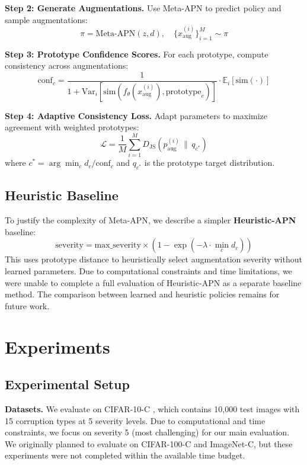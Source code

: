 \documentclass{article}
\begin{document}
\textbf{Step 2: Generate Augmentations.} Use Meta-APN to predict policy and sample augmentations:
\begin{equation}
    \pi = \text{Meta-APN}(z, d), \quad \{x_\text{aug}^{(i)}\}_{i=1}^M \sim \pi
\end{equation}

\textbf{Step 3: Prototype Confidence Scores.} For each prototype, compute consistency across augmentations:
\begin{equation}
    \text{conf}_c = \frac{1}{1 + \text{Var}_i[\text{sim}(f_\theta(x_\text{aug}^{(i)}), \text{prototype}_c)]} \cdot \mathbb{E}_i[\text{sim}(\cdot)]
\end{equation}

\textbf{Step 4: Adaptive Consistency Loss.} Adapt parameters to maximize agreement with weighted prototypes:
\begin{equation}
    \mathcal{L} = \frac{1}{M} \sum_{i=1}^M D_\text{JS}(p_\text{aug}^{(i)} \,\|\, q_{c^*})
\end{equation}
where $c^* = \arg\min_c d_c / \text{conf}_c$ and $q_{c^*}$ is the prototype target distribution.

\subsection{Heuristic Baseline}

To justify the complexity of Meta-APN, we describe a simpler \textbf{Heuristic-APN} baseline:
\begin{equation}
    \text{severity} = \text{max\_severity} \times (1 - \exp(-\lambda \cdot \min_c d_c))
\end{equation}
This uses prototype distance to heuristically select augmentation severity without learned parameters. Due to computational constraints and time limitations, we were unable to complete a full evaluation of Heuristic-APN as a separate baseline method. The comparison between learned and heuristic policies remains for future work.

\section{Experiments}

\subsection{Experimental Setup}

\textbf{Datasets.} We evaluate on CIFAR-10-C \citep{hendrycks2019benchmarking}, which contains 10,000 test images with 15 corruption types at 5 severity levels. Due to computational and time constraints, we focus on severity 5 (most challenging) for our main evaluation. We originally planned to evaluate on CIFAR-100-C and ImageNet-C, but these experiments were not completed within the available time budget.
\end{document}
